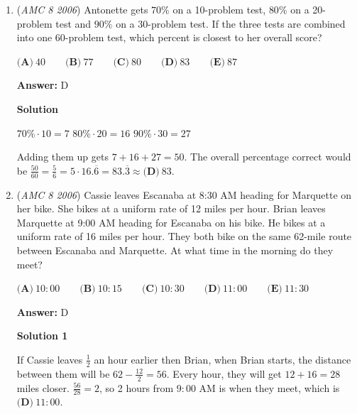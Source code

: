 \begin{enumerate}
 There are $4$ integers whose digits sum to $4$: $13, 22, 31, \text{and } 40$.

 There are $9$ integers whose digits sum to $9$: $18, 27, 36, 45, 54, 63, 72, 81, \text{and } 90$.

 There are $3$ integers whose digits sum to $16$: $79, 88, \text{and } 97$.

 Two digits cannot sum to $25$ or any greater square since the greatest sum of digits of a two-digit number is $9 + 9 = 18$.

 Thus, the answer is $1 + 4 + 9 + 3 = \boxed{\textbf{(C)} 17}$.

 


	\item (\textit{AMC 8 2006}) Antonette gets $70 \%$ on a 10-problem test, $80 \%$ on a 20-problem test and $90 \%$ on a 30-problem test. If the three tests are combined into one 60-problem test, which percent is closest to her overall score? 


 $\textbf{(A)}\ 40\qquad\textbf{(B)}\ 77\qquad\textbf{(C)}\ 80\qquad\textbf{(D)}\ 83\qquad\textbf{(E)}\ 87$

 \textbf{Answer: }D



\textbf{Solution}

$70 \% \cdot 10=7$
$80 \% \cdot 20=16$
$90 \% \cdot 30=27$

 Adding them up gets $7+16+27=50$. The overall percentage correct would be $\frac{50}{60}=\frac{5}{6}=5 \cdot 16.\overline{6}=83.\overline{3} \approx \boxed{\textbf{(D)}\ 83}$.

 


	\item (\textit{AMC 8 2006}) Cassie leaves Escanaba at 8:30 AM heading for Marquette on her bike. She bikes at a uniform rate of 12 miles per hour. Brian leaves Marquette at 9:00 AM heading for Escanaba on his bike. He bikes at a uniform rate of 16 miles per hour. They both bike on the same 62-mile route between Escanaba and Marquette. At what time in the morning do they meet? 


 $\textbf{(A)}\ 10: 00\qquad\textbf{(B)}\ 10: 15\qquad\textbf{(C)}\ 10: 30\qquad\textbf{(D)}\ 11: 00\qquad\textbf{(E)}\ 11: 30$

 \textbf{Answer: }D



\textbf{Solution 1}

If Cassie leaves $\frac{1}{2}$ an hour earlier then Brian, when Brian starts, the distance between them will be $62-\frac{12}{2}=56$. Every hour, they will get $12+16=28$ miles closer. $\frac{56}{28}=2$, so 2 hours from $9:00$ AM is when they meet, which is $\boxed{\textbf{(D)}\ 11: 00}$.


\end{enumerate}
